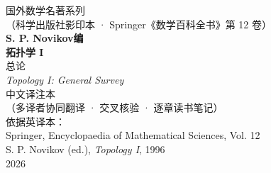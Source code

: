 \thispagestyle{empty}
\begin{center}
\vspace*{2.2cm}

{\small 国外数学名著系列}\\[2pt]
{\small （科学出版社影印本 · Springer《数学百科全书》第 12 卷）}\\[3.2cm]

{\LARGE\bfseries S. P. Novikov\quad 编}\\[2.6cm]

{\Huge\bfseries 拓扑学 I}\\[10pt]
{\LARGE 总论}\\[6pt]
{\large\itshape Topology I: General Survey}\\[3.2cm]

{\large 中文译注本}\\[4pt]
{\small （多译者协同翻译 · 交叉核验 · 逐章读书笔记）}\\[4.2cm]

{\small 依据英译本：}\\
{\small Springer, Encyclopaedia of Mathematical Sciences, Vol. 12}\\
{\small S. P. Novikov (ed.), \emph{Topology I}, 1996}\\[1.2cm]

{\small 2026}
\end{center}
\clearpage

